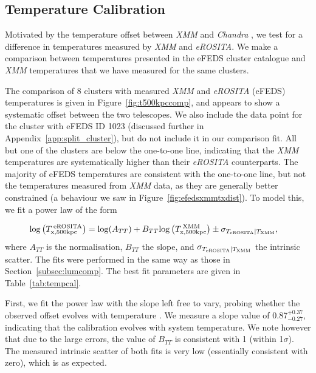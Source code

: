 \documentclass[fleqn,usenatbib]{mnras}
\begin{document}
\subsection{Temperature Calibration}
\label{subsec:tcal}
Motivated by the temperature offset between {\em XMM} and {\em Chandra} \citep[][]{xmmchandracal}, we test for a difference in temperatures measured by {\em XMM} and {\em eROSITA}. We make a comparison between temperatures presented in the eFEDS cluster catalogue and {\em XMM} temperatures that we have measured for the same clusters. 

The comparison of 8 clusters with measured {\em XMM} and {\em eROSITA} (eFEDS) temperatures is given in Figure~\ref{fig:t500kpccomp}, and appears to show a systematic offset between the two telescopes. We also include the data point for the cluster with eFEDS ID 1023 (discussed further in Appendix~\ref{app:split_cluster}), but do not include it in our comparison fit. All but one of the clusters are below the one-to-one line, indicating that the {\em XMM} temperatures are systematically higher than their {\em eROSITA} counterparts. The majority of eFEDS temperatures are consistent with the one-to-one line, but not the temperatures measured from {\em XMM} data, as they are generally better constrained (a behaviour we saw in Figure~\ref{fig:efedsxmmtxdist}). To model this, we fit a power law of the form

\begin{align}
{\rm log}\left(T^{\:\rm{eROSITA}}_{\rm{x, 500kpc}}\right) &= {\rm log}(A_{TT}) + B_{TT}{\rm log}\left(T^{\:\rm{XMM}}_{\rm{x, 500kpc}}\right) \pm \sigma_{T_{\rm{eROSITA}}|T_{\rm{XMM}}},
\label{equ:TvsT}
\end{align}
where $A_{TT}$ is the normalisation, $B_{TT}$ the slope, and $\sigma_{T_{\rm{eROSITA}}|T_{\rm{XMM}}}$ the intrinsic scatter. The fits were performed in the same way as those in Section~\ref{subsec:lumcomp}. The best fit parameters are given in Table~\ref{tab:tempcal}. 

First, we fit the power law with the slope left free to vary, probing whether the observed offset evolves with temperature \citep[as found in][comparing between {\em Chandra} and {\em XMM}]{xmmchandracal}. We measure a slope value of 0.87$^{+0.37}_{-0.27}$, indicating that the calibration evolves with system temperature.  We note however that due to the large errors, the value of $B_{TT}$ is consistent with 1 (within 1$\sigma$).  The measured intrinsic scatter of both fits is very low (essentially consistent with zero), which is as expected.
 
\end{document}
